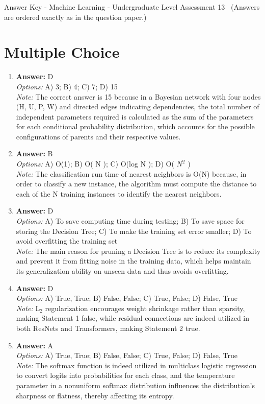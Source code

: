 \documentclass[12pt]{article}
\begin{document}
\begin{center}
Answer Key - Machine Learning - Undergraduate Level Assessment 13 \
\small (Answers are ordered exactly as in the question paper.)
\end{center}

\section*{Multiple Choice}
\begin{enumerate}[label=\arabic*.]
\item \textbf{Answer:} D
\\ \textit{Options:} A) 3; B) 4; C) 7; D) 15
\\ \textit{Note:} The correct answer is 15 because in a Bayesian network with four nodes (H, U, P, W) and directed edges indicating dependencies, the total number of independent parameters required is calculated as the sum of the parameters for each conditional probability distribution, which accounts for the possible configurations of parents and their respective values.
\item \textbf{Answer:} B
\\ \textit{Options:} A) O(1); B) O( N ); C) O(log N ); D) O( $N^2$ )
\\ \textit{Note:} The classification run time of nearest neighbors is O(N) because, in order to classify a new instance, the algorithm must compute the distance to each of the N training instances to identify the nearest neighbors.
\item \textbf{Answer:} D
\\ \textit{Options:} A) To save computing time during testing; B) To save space for storing the Decision Tree; C) To make the training set error smaller; D) To avoid overfitting the training set
\\ \textit{Note:} The main reason for pruning a Decision Tree is to reduce its complexity and prevent it from fitting noise in the training data, which helps maintain its generalization ability on unseen data and thus avoids overfitting.
\item \textbf{Answer:} D
\\ \textit{Options:} A) True, True; B) False, False; C) True, False; D) False, True
\\ \textit{Note:} L$_{2}$ regularization encourages weight shrinkage rather than sparsity, making Statement 1 false, while residual connections are indeed utilized in both ResNets and Transformers, making Statement 2 true.
\item \textbf{Answer:} A
\\ \textit{Options:} A) True, True; B) False, False; C) True, False; D) False, True
\\ \textit{Note:} The softmax function is indeed utilized in multiclass logistic regression to convert logits into probabilities for each class, and the temperature parameter in a nonuniform softmax distribution influences the distribution's sharpness or flatness, thereby affecting its entropy.
\end{enumerate}
\end{document}
